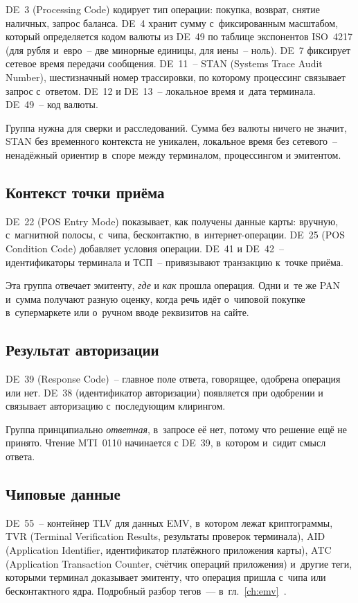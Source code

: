 DE~3 (Processing Code) кодирует тип операции: покупка, возврат, снятие наличных, запрос баланса.
DE~4 хранит сумму с~фиксированным масштабом, который определяется кодом валюты из DE~49 по таблице экспонентов ISO~4217 (для рубля и~евро~-- две минорные единицы, для иены~-- ноль).
DE~7 фиксирует сетевое время передачи сообщения. DE~11~-- STAN (Systems Trace Audit Number), шестизначный номер трассировки, по которому процессинг связывает запрос с~ответом. DE~12 и DE~13~-- локальное время и~дата терминала. DE~49~-- код валюты.

Группа нужна для сверки и расследований. Сумма без валюты ничего не значит, STAN без временного контекста не уникален, локальное время без сетевого~-- ненадёжный ориентир в~споре между терминалом, процессингом и эмитентом.

\subsection*{Контекст точки приёма}

DE~22 (POS Entry Mode) показывает, как получены данные карты: вручную, с~магнитной полосы, с~чипа, бесконтактно, в~интернет-операции. DE~25 (POS Condition Code) добавляет условия операции. DE~41 и DE~42~-- идентификаторы терминала и ТСП~-- привязывают транзакцию к~точке приёма.

Эта группа отвечает эмитенту, \emph{где} и \emph{как} прошла операция. Одни и~те же PAN и~сумма получают разную оценку, когда речь идёт о~чиповой покупке в~супермаркете или о~ручном вводе реквизитов на сайте.

\subsection*{Результат авторизации}

DE~39 (Response Code)~-- главное поле ответа, говорящее, одобрена операция или нет. DE~38 (идентификатор авторизации) появляется при одобрении и связывает авторизацию с~последующим клирингом.

Группа принципиально \emph{ответная}, в~запросе её нет, потому что решение ещё не принято. Чтение MTI~0110 начинается с DE~39, в~котором и~сидит смысл ответа.

\subsection*{Чиповые данные}

DE~55~-- контейнер TLV для данных EMV, в~котором лежат криптограммы, TVR (Terminal Verification Results, результаты проверок терминала), AID (Application Identifier, идентификатор платёжного приложения карты), ATC (Application Transaction Counter, счётчик операций приложения) и~другие теги, которыми терминал доказывает эмитенту, что операция пришла с~чипа или бесконтактного ядра. Подробный разбор тегов~--- в~гл.~\ref{ch:emv}~\cite{emvco-specs}.

